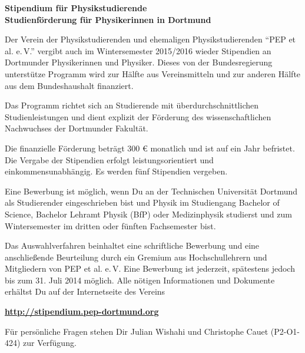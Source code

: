 \documentclass[
  paper=a4,
  fontsize=12pt,
  DIV=16,
  headheight=52pt,
  footheight=45pt,
  headinclude,
  parskip=full,
]{scrartcl}
\date{31. Juli 2014}
\begin{document}
\textbf{\Huge\sffamily Stipendium für Physikstudierende}\\[0.5\baselineskip]
\textbf{\Large\sffamily Studienförderung für  Physikerinnen in Dortmund}

{\large Der Verein der Physikstudierenden und ehemaligen Physikstudierenden \enquote{PEP et al. e.\,V.}
vergibt auch im Wintersemester 2015/2016 wieder Stipendien an Dortmunder Physikerinnen und Physiker.
Dieses von der Bundesregierung unterstütze Programm wird zur
Hälfte aus Vereinsmitteln und zur anderen Hälfte aus dem Bundeshaushalt finanziert.
}

Das Programm richtet sich an Studierende mit überdurchschnittlichen Studienleistungen und dient explizit der Förderung des wissenschaftlichen Nachwuchses der Dortmunder Fakultät.

Die finanzielle Förderung beträgt 300 € monatlich und ist auf ein Jahr befristet.
Die Vergabe der Stipendien erfolgt leistungsorientiert und einkommensunabhängig.
Es werden fünf Stipendien vergeben.

Eine Bewerbung ist möglich, wenn Du an der Technischen Universität Dortmund als Studierender eingeschrieben bist und Physik im Studiengang Bachelor of Science, Bachelor
Lehramt Physik (BfP) oder Medizinphysik studierst und zum Wintersemester im dritten
oder fünften Fachsemester bist.

Das Auswahlverfahren beinhaltet eine schriftliche Bewerbung und eine anschließende
Beurteilung durch ein Gremium aus Hochschullehrern und Mitgliedern von PEP et al. e.\,V.
Eine Bewerbung ist jederzeit, spätestens jedoch bis zum 31. Juli 2014 möglich.
Alle nötigen Informationen und Dokumente erhältst Du auf der Internetseite des Vereins

\begin{center}
  \Huge\bfseries\url{http://stipendium.pep-dortmund.org}
\end{center}

Für persönliche Fragen stehen Dir Julian Wishahi und Christophe Cauet (P2-O1-424) zur
Verfügung.
\end{document}
